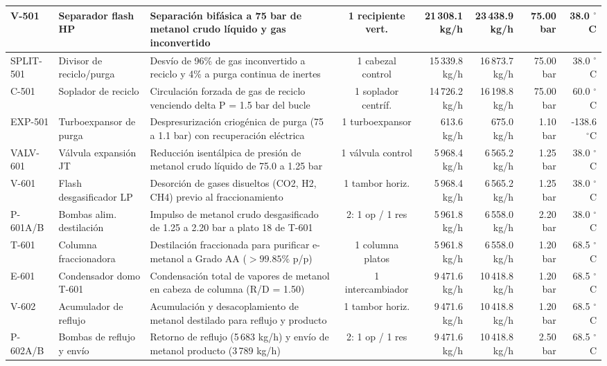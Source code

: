 \documentclass[10pt,letterpaper]{article}
\begin{document}
\begin{landscape}
\begin{xltabular}{\linewidth}{|l|p{2.6cm}|p{5.5cm}|c|r|r|r|r|}
V-501 & Separador flash HP & Separación bifásica a 75 bar de metanol crudo líquido y gas inconvertido & 1 recipiente vert. & 21\,308.1 kg/h & 23\,438.9 kg/h & 75.00 bar & 38.0 $^\circ$C \\ \hline
SPLIT-501 & Divisor de reciclo/purga & Desvío de 96\% de gas inconvertido a reciclo y 4\% a purga continua de inertes & 1 cabezal control & 15\,339.8 kg/h & 16\,873.7 kg/h & 75.00 bar & 38.0 $^\circ$C \\ \hline
C-501 & Soplador de reciclo & Circulación forzada de gas de reciclo venciendo delta P = 1.5 bar del bucle & 1 soplador centríf. & 14\,726.2 kg/h & 16\,198.8 kg/h & 75.00 bar & 60.0 $^\circ$C \\ \hline
EXP-501 & Turboexpansor de purga & Despresurización criogénica de purga (75 a 1.1 bar) con recuperación eléctrica & 1 turboexpansor & 613.6 kg/h & 675.0 kg/h & 1.10 bar & -138.6 $^\circ$C \\ \hline
VALV-601 & Válvula expansión JT & Reducción isentálpica de presión de metanol crudo líquido de 75.0 a 1.25 bar & 1 válvula control & 5\,968.4 kg/h & 6\,565.2 kg/h & 1.25 bar & 38.0 $^\circ$C \\ \hline
V-601 & Flash desgasificador LP & Desorción de gases disueltos (CO2, H2, CH4) previo al fraccionamiento & 1 tambor horiz. & 5\,968.4 kg/h & 6\,565.2 kg/h & 1.25 bar & 38.0 $^\circ$C \\ \hline
P-601A/B & Bombas alim. destilación & Impulso de metanol crudo desgasificado de 1.25 a 2.20 bar a plato 18 de T-601 & 2: 1 op / 1 res & 5\,961.8 kg/h & 6\,558.0 kg/h & 2.20 bar & 38.0 $^\circ$C \\ \hline
T-601 & Columna fraccionadora & Destilación fraccionada para purificar e-metanol a Grado AA ($>99.85\%$ p/p) & 1 columna platos & 5\,961.8 kg/h & 6\,558.0 kg/h & 1.20 bar & 68.5 $^\circ$C \\ \hline
E-601 & Condensador domo T-601 & Condensación total de vapores de metanol en cabeza de columna (R/D = 1.50) & 1 intercambiador & 9\,471.6 kg/h & 10\,418.8 kg/h & 1.20 bar & 68.5 $^\circ$C \\ \hline
V-602 & Acumulador de reflujo & Acumulación y desacoplamiento de metanol destilado para reflujo y producto & 1 tambor horiz. & 9\,471.6 kg/h & 10\,418.8 kg/h & 1.20 bar & 68.5 $^\circ$C \\ \hline
P-602A/B & Bombas de reflujo y envío & Retorno de reflujo (5\,683 kg/h) y envío de metanol producto (3\,789 kg/h) & 2: 1 op / 1 res & 9\,471.6 kg/h & 10\,418.8 kg/h & 2.50 bar & 68.5 $^\circ$C \\ \hline

\end{xltabular}
\end{landscape}
\end{document}
